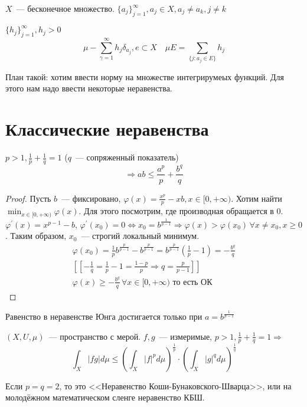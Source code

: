 \documentclass[document]{subfiles}
\begin{document}
\begin{example}
    $X$~--- бесконечное множество. $ \{ a_j \}_{j=1}^\infty, a_j \in X, a_j \ne a_k, j \ne k$ 
    
    $\{h_j \}^\infty_{j=1}, h_j > 0$ 
    \[ \mu - \sum^\infty_{\gamma = 1} h_j \delta_{a_j}, e \subset X \quad \mu E = \sum_{\{ j: a_j \in E \}} h_j \]
\end{example}

План такой: хотим ввести норму на множестве интегрирумеых функций. Для этого нам надо ввести некоторые неравенства.
\section{Классические неравенства}

\begin{theorem}
    $p > 1, \frac{1}{p} + \frac{1}{q} = 1$ ($q$~--- сопряженный показатель)
    \[ \Rightarrow ab \leq \frac{a^p}{p} + \frac{b^q}{q} \]
\end{theorem}

\begin{proof}
    Пусть $b$~--- фиксировано, $\varphi(x) = \frac{x^p}{p} - xb, x \in [0, + \infty)$. Хотим найти $\min_{x \in [0, +\infty)} \varphi(x)$. Для этого посмотрим, где производная обращается в 0.
    $\varphi^\prime(x) = x^{p-1} - b$, $\varphi^\prime(x_0) = 0 \Leftrightarrow x_0 = b^{\frac{1}{p-1}} \Rightarrow \varphi(x) > \varphi(x_0) \, \forall x \ne x_0, x \geq 0$.
    Таким образом, $x_0$~--- строгий локальный минимум.
    \begin{gather*}
        \varphi(x_0) = \frac{1}{p} b^{\frac{p}{p-1}} - b^{\frac{p}{p-1}} = b^{\frac{p}{p-1}}\left( \frac{1}{p} -1 \right)  = -\frac{b^q}{q}  \\
       \left[ \left[ -\frac{1}{q} = \frac{1}{p} - 1 = \frac{1-p}{p} \Rightarrow q = \frac{p}{p-1} \right] \right]\\
        \varphi(x) \geq - \frac{b^q}{q} \, \forall x \in [0, + \infty) \text { то есть ОК} 
    \end{gather*}
\end{proof}

\begin{remark}
    Равенство в неравенстве Юнга достигается только при $a = b^{\frac{1}{p-1}}$
\end{remark}

\begin{theorem}
    $(X, U, \mu)$~--- пространство с мерой. $f, g$~--- измеримые, $p > 1, \frac{1}{p} + \frac{1}{q} = 1 \Rightarrow$
    \[ \int_X |fg| d\mu \leq \left( \int_X |f|^p d\mu \right)^{\frac{1}{p}} \cdot \left( \int_X |g|^q d\mu \right)^{\frac{1}{q}} \tag{*} \]
\end{theorem}
Если $p=q=2$, то это <<Неравенство Коши-Бунаковского-Шварца>>, или на молодёжном математическом сленге неравенство КБШ.
\end{document}
